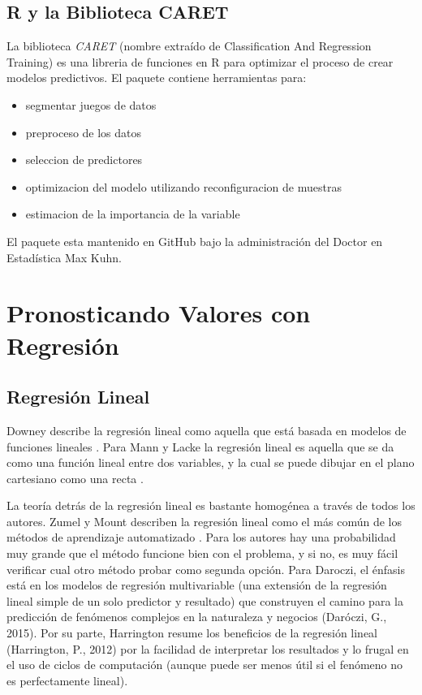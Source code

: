 \documentclass[letterpaper, spanish, 11pt]{report}
\begin{document}
\subsection{R y la Biblioteca CARET}
La biblioteca \emph{CARET} (nombre extraído de Classification And Regression Training) es una libreria de funciones en R para optimizar el proceso de crear modelos predictivos. El paquete contiene herramientas para:

\begin{itemize}
	\item segmentar juegos de datos
	\item preproceso de los datos
	\item seleccion de predictores
	\item optimizacion del modelo utilizando reconfiguracion de muestras
	\item estimacion de la importancia de la variable
\end{itemize}

El paquete esta mantenido en GitHub bajo la administración del Doctor en Estadística Max Kuhn. 

\section{Pronosticando Valores con Regresión}

\subsection{Regresión Lineal}
Downey describe la regresión lineal como aquella que está basada en modelos de funciones lineales \cite{thinkStats}. Para Mann y Lacke la regresión lineal es aquella que se da como una función lineal entre dos variables, y la cual se puede dibujar en el plano cartesiano como una recta \cite{intoStats7}. 

La teoría detrás de la regresión lineal es bastante homogénea a través de todos los autores. Zumel y Mount describen la regresión lineal como el más común de los métodos de aprendizaje automatizado \cite{zumelMount}. Para los autores hay una probabilidad muy grande que el método funcione bien con el problema, y si no, es muy fácil verificar cual otro método probar como segunda opción. Para Daroczi, el énfasis está en los modelos de regresión multivariable (una extensión de la regresión lineal simple de un solo predictor y resultado) que construyen el camino para la predicción de fenómenos complejos en la naturaleza y negocios (Daróczi, G., 2015). Por su parte, Harrington resume los beneficios de la regresión lineal (Harrington, P., 2012) por la facilidad de interpretar los resultados y lo frugal en el uso de ciclos de computación (aunque puede ser menos útil si el fenómeno no es perfectamente lineal).
\end{document}
